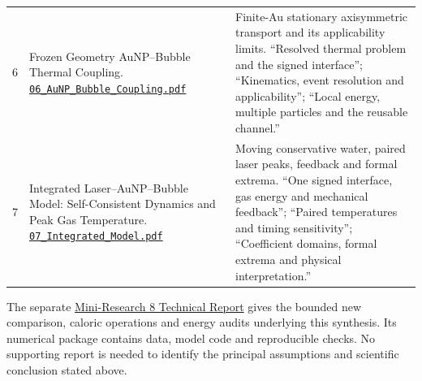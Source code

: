 \documentclass[11pt,a4paper]{article}
\begin{document}
\begin{longtable}{p{.65cm}>{\raggedright\arraybackslash}p{6.9cm}>{\raggedright\arraybackslash}p{6.7cm}}
6&Frozen Geometry AuNP--Bubble Thermal Coupling. \href{https://github.com/DimitriBolt/Plasma/blob/main/Mini_Research/06_AuNP_Bubble_Coupling/report/06_AuNP_Bubble_Coupling.pdf}{\nolinkurl{06_AuNP_Bubble_Coupling.pdf}}&Finite-Au stationary axisymmetric transport and its applicability limits. ``Resolved thermal problem and the signed interface''; ``Kinematics, event resolution and applicability''; ``Local energy, multiple particles and the reusable channel.''\\[7pt]
7&Integrated Laser--AuNP--Bubble Model: Self-Consistent Dynamics and Peak Gas Temperature. \href{https://github.com/DimitriBolt/Plasma/blob/main/Mini_Research/07_Integrated_Model/report/07_Integrated_Model.pdf}{\nolinkurl{07_Integrated_Model.pdf}}&Moving conservative water, paired laser peaks, feedback and formal extrema. ``One signed interface, gas energy and mechanical feedback''; ``Paired temperatures and timing sensitivity''; ``Coefficient domains, formal extrema and physical interpretation.''\\\bottomrule
\end{longtable}
\normalsize
The separate \href{https://github.com/DimitriBolt/Plasma/blob/main/Mini_Research/08_Physical_Feasibility/report/08_Physical_Feasibility.pdf}{Mini-Research 8 Technical Report} gives the bounded new comparison, caloric operations and energy audits underlying this synthesis. Its numerical package contains data, model code and reproducible checks. No supporting report is needed to identify the principal assumptions and scientific conclusion stated above.
\end{document}
